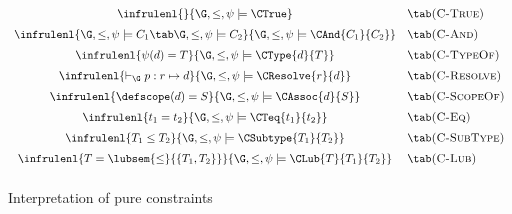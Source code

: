 \begin{figure}[t]
\begin{boxedminipage}{\hsize}
\centering
$\begin{array}{cl}
  \infrulenl{}{\extenv,\psi \models \CTrue}
  & \labl{C-True}\\
  \infrulenl{\extenv,\psi \models C_1 \tab \extenv,\psi \models C_2}
  {\extenv,\psi \models \CAnd{C_1}{C_2}}
  & \labl{C-And}\\
  \infrulenl{\psi(d) = T}
  {\extenv,\psi \models \CType{d}{T} }
  & \labl{C-TypeOf} \\
  \infrulenl{\vdash_{\G} p : r \mapsto d}
  {\extenv,\psi \models \CResolve{r}{d}}
  & \labl{C-Resolve} \\
  \infrulenl{\defscope(d) = S}
  {\extenv,\psi \models \CAssoc{d}{S}}
  & \labl{C-ScopeOf} \\
  \infrulenl{t_1 = t_2}
  {\extenv,\psi \models \CTeq{t_1}{t_2}}
  & \labl{C-Eq} \\
  \infrulenl{T_1 \leq T_2}
  {\extenv,\psi \models \CSubtype{T_1}{T_2}}
  & \labl{C-SubType} \\
  \infrulenl{T = \lubsem{\leq}{\{T_1,T_2\}}}
  {\extenv,\psi \models \CLub{T}{T_1}{T_2}}
  & \labl{C-Lub} \\
\end{array}$

\end{boxedminipage}
  \caption{Interpretation of pure constraints}
  \label{fig:conssem}
\end{figure}
